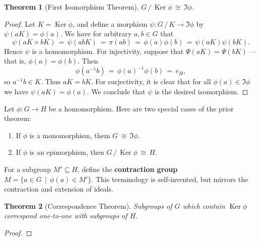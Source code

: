\documentclass[11pt]{article}
\newtheorem{theorem}{Theorem}
\newcommand{\Ker}{\operatorname{Ker}}
\begin{document}
\begin{adjustwidth}{0.5cm}{}
  \begin{theorem}[First Isomorphism Theorem]
     $G \, / \, \Ker \phi \, \cong \, \Im \phi$.
  \end{theorem}
  \begin{proof}
    Let $K = \Ker \phi$, and define a morphism $\psi : G \, / \, K \to \Im \phi$ by $\psi(aK) = \phi(a)$. We have for arbitrary $a, b \in G$ that
    \[
      \psi(aK \times bK) \, = \, \psi(abK) \, = \, \pi(ab) \, = \, \phi(a) \phi(b) \, = \, \psi(aK) \psi(bK).
    \]
    Hence $\psi$ is a homomorphism. For injectivity, suppose that $\Psi(aK) = \Psi(bK)$ --- that is, $\phi(a) = \phi(b)$. Then
    \[
      \phi(a^{-1}b) \, = \, \phi(a)^{-1} \phi(b) \, = \, e_{H},
    \]
    so $a^{-1}b \in K$. Thus $aK = bK$. For surjectivity, it is clear that for all $\phi(a) \in \Im \phi$ we have $\psi(aK) = \phi(a)$. We conclude that $\psi$ is the desired isomorphism.
  \end{proof}
\end{adjustwidth}

\newpage

Let $\phi : G \to H$ be a homomorphism. Here are two special cases of the prior theorem:
\begin{enumerate}
  \item If $\phi$ is a monomorphism, them $G \, \cong \, \Im \phi$.
  \item If $\phi$ is an epimorphism, then $G \, / \, \Ker \phi \, \cong \, H$.
\end{enumerate}

For a subgroup $M' \subseteq H$, define the \textbf{contraction group} $M = \{ a \in G \, \mid \, \phi(a) \in M' \}$. This terminology is self-invented, but mirrors the contraction and extension of ideals.

\begin{adjustwidth}{0.5cm}{}
  \begin{theorem}[Correspondence Theorem]
    Subgroups of $G$ which contain $\Ker \phi$ correspond one-to-one with subgroups of $H$.
  \end{theorem}
  \begin{proof}
    
  \end{proof}
\end{adjustwidth}

\end{document}
